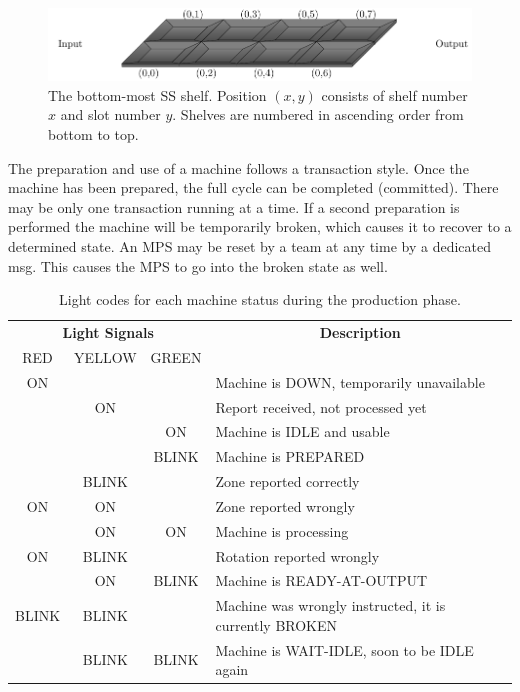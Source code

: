 \documentclass[12pt,twoside]{article}
\begin{document}
\begin{figure}[ht]
  \centering
    \includegraphics{figures/storage-shelf.pdf}
    \caption{The bottom-most \ac{SS} shelf. Position $(x,y)$ consists of
      shelf number $x$ and slot number $y$.
    Shelves are numbered in ascending order from bottom to top.}
    \label{fig:ss-shelf}
\end{figure}

\medskip
The preparation and use of a machine follows a transaction style. Once the
machine has been prepared, the full cycle can be completed (committed).
There may be only one transaction running at a time. If a
second preparation is performed the machine will
be temporarily broken, which causes it to recover to a determined state.
An \ac{MPS} may be reset by a team at any time by a dedicated msg.
This causes the \ac{MPS} to go into the broken state as well.

\begin{table}
  \begin{tabular}{c|c|c||l}
    \hline
    \multicolumn{3}{c||}{\bf{Light Signals}} &
    \multicolumn{1}{c}{\bf{Description}} \\\cline{1-3}
    RED & YELLOW    & GREEN & \\\hline
    ON    &       &       & Machine is DOWN, temporarily unavailable \\
          & ON    &       & Report received, not processed yet \\
          &       & ON    & Machine is IDLE and usable  \\
          &       & BLINK & Machine is PREPARED  \\
          & BLINK &       & Zone reported correctly \\
    ON    & ON    &       & Zone reported wrongly \\
          & ON    & ON    & Machine is processing \\
    ON    & BLINK &       & Rotation reported wrongly \\
          & ON    & BLINK & Machine is READY-AT-OUTPUT \\
    BLINK & BLINK &       & Machine was wrongly instructed, it is currently
    BROKEN \\
          & BLINK & BLINK & Machine is WAIT-IDLE, soon to be IDLE again \\
  \end{tabular}
  \caption{Light codes for each machine status during the production phase.}
  \label{tab:machine-lights}
\end{table}
\end{document}
